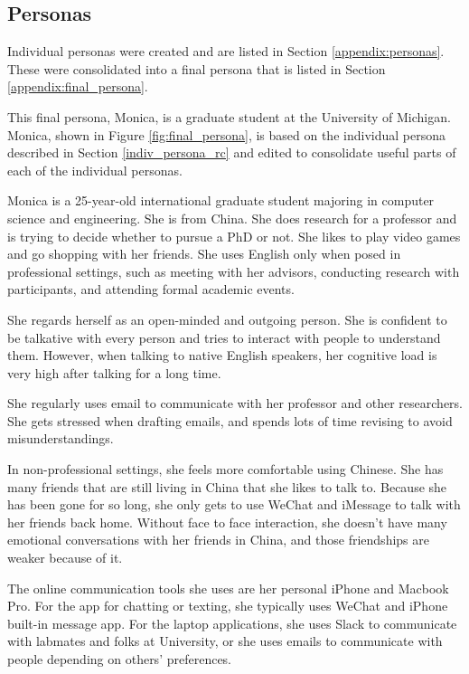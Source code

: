 \documentclass[acmsmall,screen,authorversion,nonacm]{acmart}
\begin{document}
\subsection{Personas}

Individual personas were created and are listed in Section \ref{appendix:personas}. These were consolidated into a final persona that is listed in Section \ref{appendix:final_persona}.

This final persona, Monica, is a graduate student at the University of Michigan. 
Monica, shown in Figure \ref{fig:final_persona}, is based on the individual persona described in Section \ref{indiv_persona_rc} and edited to consolidate useful parts of each of the individual personas.

Monica is a 25-year-old international graduate student majoring in computer science and engineering. She is from China. She does research for a professor and is trying to decide whether to pursue a PhD or not. She likes to play video games and go shopping with her friends. She uses English only when posed in professional settings, such as meeting with her advisors, conducting research with participants, and attending formal academic events. 

She regards herself as an open-minded and outgoing person. She is confident to be talkative with every person and tries to interact with people to understand them. However, when talking to native English speakers, her cognitive load is very high after talking for a long time. 

She regularly uses email to communicate with her professor and other researchers. She gets stressed when drafting emails, and spends lots of time revising to avoid misunderstandings.

In non-professional settings, she feels more comfortable using Chinese. She has many friends that are still living in China that she likes to talk to. Because she has been gone for so long, she only gets to use WeChat and iMessage to talk with her friends back home. Without face to face interaction, she doesn't have many emotional conversations with her friends in China, and those friendships are weaker because of it.

The online communication tools she uses are her personal iPhone and Macbook Pro. For the
app for chatting or texting, she typically uses WeChat and iPhone built-in message app. For the laptop applications, she uses Slack to communicate with labmates and folks at University, or she uses emails to communicate with people depending on others' preferences.
\end{document}
